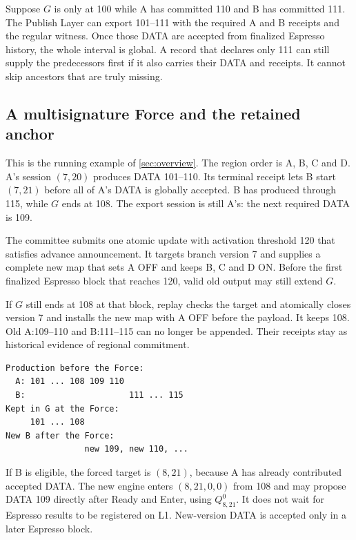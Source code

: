 \documentclass[11pt,a4paper]{article}
\begin{document}
Suppose $G$ is only at 100 while A has committed 110 and B has committed
111. The Publish Layer can export 101--111 with the required A and B
receipts and the regular witness. Once those DATA are accepted from
finalized Espresso history, the whole interval is global. A record that
declares only 111 can still supply the predecessors first if it also
carries their DATA and receipts. It cannot skip ancestors that are truly
missing.

\subsection{A multisignature Force and the retained anchor}
\label{sec:force-example}
This is the running example of \cref{sec:overview}. The region order is
A, B, C and D. A's session $(7,20)$ produces DATA 101--110. Its terminal receipt
lets B start $(7,21)$ before all of A's DATA is globally accepted. B has
produced through 115, while $G$ ends at 108. The export session is still
A's: the next required DATA is 109.

The committee submits one atomic update with activation threshold 120
that satisfies advance announcement. It targets branch version 7 and
supplies a complete new map that sets A OFF and keeps B, C and D ON.
Before the first finalized Espresso block that
reaches 120, valid old output may still extend $G$.

If $G$ still ends at 108 at that block, replay checks the target and
atomically closes version 7 and installs the new map with A OFF before
the payload. It keeps 108. Old
A:109--110 and B:111--115 can no longer be appended. Their receipts stay
as historical evidence of regional commitment.

\begin{center}\small
\begin{verbatim}
Production before the Force:
  A: 101 ... 108 109 110
  B:                     111 ... 115
Kept in G at the Force:
     101 ... 108
New B after the Force:
                new 109, new 110, ...
\end{verbatim}
\end{center}

If B is eligible, the forced target is $(8,21)$, because A has already
contributed accepted DATA. The new engine enters $(8,21,0,0)$ from 108 and
may propose DATA 109 directly after Ready and Enter, using $Q^0_{8,21}$. It does not
wait for Espresso results to be registered on L1. New-version DATA is
accepted only in a later Espresso block.
\end{document}
